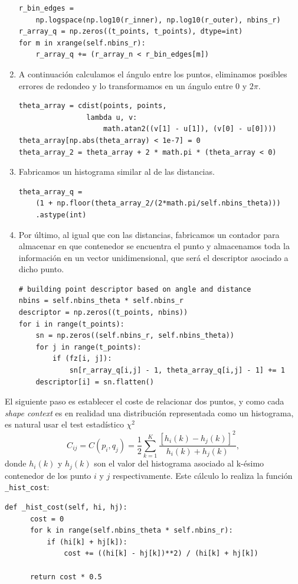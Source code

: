 \documentclass[size=a4, parskip=half, titlepage=false, toc=flat, toc=bib, 12pt]{scrartcl}
\begin{document}
\begin{enumerate}
\begin{verbatim}
r_bin_edges =
    np.logspace(np.log10(r_inner), np.log10(r_outer), nbins_r)
r_array_q = np.zeros((t_points, t_points), dtype=int)
for m in xrange(self.nbins_r):
    r_array_q += (r_array_n < r_bin_edges[m])
\end{verbatim}

\item A continuación calculamos el ángulo entre los puntos, eliminamos posibles errores de redondeo y lo transformamos en un ángulo entre 0 y $2\pi$.
\begin{verbatim}
theta_array = cdist(points, points,
                lambda u, v:
                    math.atan2((v[1] - u[1]), (v[0] - u[0])))
theta_array[np.abs(theta_array) < 1e-7] = 0
theta_array_2 = theta_array + 2 * math.pi * (theta_array < 0)
\end{verbatim}
\item Fabricamos un histograma similar al de las distancias.
\begin{verbatim}
theta_array_q =
    (1 + np.floor(theta_array_2/(2*math.pi/self.nbins_theta)))
    .astype(int)
\end{verbatim}
\item Por último, al igual que con las distancias, fabricamos un contador para almacenar en que contenedor se encuentra el punto y almacenamos toda la información en un vector unidimensional, que será el descriptor asociado a dicho punto.
\begin{verbatim}
# building point descriptor based on angle and distance
nbins = self.nbins_theta * self.nbins_r
descriptor = np.zeros((t_points, nbins))
for i in range(t_points):
    sn = np.zeros((self.nbins_r, self.nbins_theta))
    for j in range(t_points):
        if (fz[i, j]):
            sn[r_array_q[i,j] - 1, theta_array_q[i,j] - 1] += 1
    descriptor[i] = sn.flatten()
\end{verbatim}
\end{enumerate}

El siguiente paso es establecer el coste de relacionar dos puntos, y como cada \textit{shape context} es en realidad una distribución representada como un histograma, es natural usar el test estadístico $\chi^2$
\[
C_{ij} = C(p_i,q_j) = \frac{1}{2} \sum_{k=1}^K \frac{[h_i(k) - h_j(k)]^2}{h_i(k) + h_j(k)},
\]
donde $h_i(k)$ y $h_j(k)$ son el valor del histograma asociado al k-ésimo contenedor de los punto $i$ y $j$ respectivamente. Este cálculo lo realiza la función \texttt{\_hist\_cost}:

\begin{verbatim}
def _hist_cost(self, hi, hj):
      cost = 0
      for k in range(self.nbins_theta * self.nbins_r):
          if (hi[k] + hj[k]):
              cost += ((hi[k] - hj[k])**2) / (hi[k] + hj[k])

      return cost * 0.5
\end{verbatim}
\end{document}
